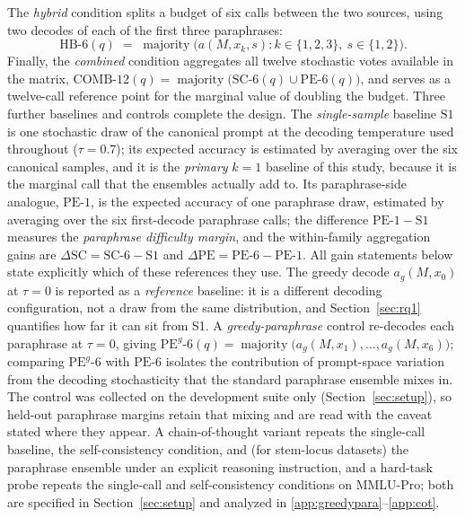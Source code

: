 The \emph{hybrid} condition splits a budget of six calls between the two sources, using two decodes of each of the first three paraphrases:
\begin{equation}
\mathrm{HB}\text{-}6(q) \;=\; \operatorname*{majority}\bigl( a(M, x_k, s) : k \in \{1,2,3\},\ s \in \{1,2\} \bigr).
\end{equation}
Finally, the \emph{combined} condition aggregates all twelve stochastic votes available in the matrix, $\mathrm{COMB}\text{-}12(q) = \operatorname{majority}\bigl( \mathrm{SC}\text{-}6(q) \cup \mathrm{PE}\text{-}6(q) \bigr)$, and serves as a twelve-call reference point for the marginal value of doubling the budget. Three further baselines and controls complete the design. The \emph{single-sample} baseline $\mathrm{S1}$ is one stochastic draw of the canonical prompt at the decoding temperature used throughout ($\tau = 0.7$); its expected accuracy is estimated by averaging over the six canonical samples, and it is the \emph{primary} $k{=}1$ baseline of this study, because it is the marginal call that the ensembles actually add to. Its paraphrase-side analogue, $\mathrm{PE}\text{-}1$, is the expected accuracy of one paraphrase draw, estimated by averaging over the six first-decode paraphrase calls; the difference $\mathrm{PE}\text{-}1 - \mathrm{S1}$ measures the \emph{paraphrase difficulty margin}, and the within-family aggregation gains are $\Delta\mathrm{SC} = \mathrm{SC}\text{-}6 - \mathrm{S1}$ and $\Delta\mathrm{PE} = \mathrm{PE}\text{-}6 - \mathrm{PE}\text{-}1$. All gain statements below state explicitly which of these references they use. The greedy decode $a_g(M, x_0)$ at $\tau = 0$ is reported as a \emph{reference} baseline: it is a different decoding configuration, not a draw from the same distribution, and Section~\ref{sec:rq1} quantifies how far it can sit from S1. A \emph{greedy-paraphrase} control re-decodes each paraphrase at $\tau = 0$, giving $\mathrm{PE}^{g}\text{-}6(q) = \operatorname{majority}\bigl( a_g(M, x_1), \dots, a_g(M, x_6) \bigr)$; comparing $\mathrm{PE}^{g}\text{-}6$ with $\mathrm{PE}\text{-}6$ isolates the contribution of prompt-space variation from the decoding stochasticity that the standard paraphrase ensemble mixes in. The control was collected on the development suite only (Section~\ref{sec:setup}), so held-out paraphrase margins retain that mixing and are read with the caveat stated where they appear. A chain-of-thought variant repeats the single-call baseline, the self-consistency condition, and (for stem-locus datasets) the paraphrase ensemble under an explicit reasoning instruction, and a hard-task probe repeats the single-call and self-consistency conditions on MMLU-Pro; both are specified in Section~\ref{sec:setup} and analyzed in \ref{app:greedypara}--\ref{app:cot}.

